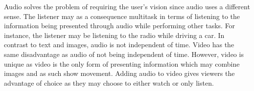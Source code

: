 Audio solves the problem of requiring the user's vision since audio uses a different sense. The listener may as a consequence multitask in terms of listening to the information being presented through audio while performing other tasks. For instance, the listener may be listening to the radio while driving a car. In contrast to text and images, audio is not independent of time. Video has the same disadvantage as audio of not being independent of time. However, video is unique as video is the only form of presenting information which may combine images and as such show movement. Adding audio to video gives viewers the advantage of choice as they may choose to either watch or only listen.